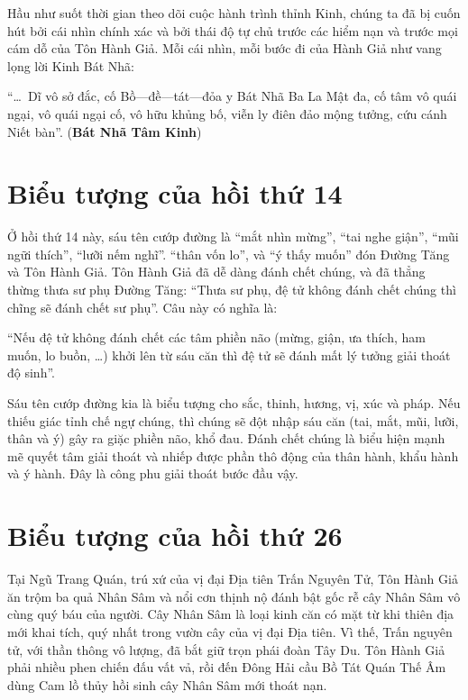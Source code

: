 Hầu như suốt thời gian theo dõi cuộc hành trình thỉnh Kinh, chúng ta đã bị cuốn hút bởi cái nhìn chính xác và bởi thái độ tự chủ trước các hiểm nạn và trước mọi cám dỗ của Tôn Hành Giả. Mỗi cái nhìn, mỗi bước đi của Hành Giả như vang lọng lời Kinh Bát Nhã:

``\ldots ~Dĩ vô sở đắc, cố Bồ—đề—tát—đỏa y Bát Nhã Ba La Mật đa, cố tâm vô quái ngại, vô quái ngại cố, vô hữu khủng bố, viễn ly điên đảo mộng tưởng, cứu cánh Niết bàn''. ({\bf Bát Nhã Tâm Kinh})

\section{Biểu tượng của hồi thứ 14} %
\label{sec:bieu_tuong_cua_hoi_thu_14}

Ở hồi thứ 14 này, sáu tên cướp đường là ``mắt nhìn mừng'', ``tai nghe giận'', ``mũi ngữi thích'', ``lưỡi nếm nghĩ''. ``thân vốn lo'', và ``ý thấy muốn'' đón Đường Tăng và Tôn Hành Giả. Tôn Hành Giả đã dễ dàng đánh chết chúng, và đã thẳng thừng thưa sư phụ Đường Tăng: ``Thưa sư phụ, đệ tử không đánh chết chúng thì chĩng sẽ đánh chết sư phụ''. Câu này có nghĩa là:

``Nếu đệ tử không đánh chết các tâm phiền não (mừng, giận, ưa thích, ham muốn, lo buồn, \ldots) khởi lên từ sáu căn thì đệ tử sẽ đánh mất lý tưởng giải thoát độ sinh''.

Sáu tên cướp đường kia là biểu tượng cho sắc, thinh, hương, vị, xúc và pháp. Nếu thiếu giác tỉnh chế ngự chúng, thì chúng sẽ đột nhập sáu căn (tai, mắt, mũi, lưỡi, thân và ý) gây ra giặc phiền não, khổ đau. Đánh chết chúng là biểu hiện mạnh mẽ quyết tâm giải thoát và nhiếp được phần thô động của thân hành, khẩu hành và ý hành. Đây là công phu giải thoát bước đầu vậy.

\section{Biểu tượng của hồi thứ 26} %
\label{sec:bieu_tuong_cua_hoi_thu_26}

Tại Ngũ Trang Quán, trú xứ của vị đại Địa tiên Trấn Nguyên Tử, Tôn Hành Giả ăn trộm ba quả Nhân Sâm và nổi cơn thịnh nộ đánh bật gốc rễ cây Nhân Sâm vô cùng quý báu của người. Cây Nhân Sâm là loại kinh căn có mặt từ khi thiên địa mới khai tích, quý nhất trong vườn cây của vị đại Địa tiên. Vì thế, Trấn nguyên tử, với thần thông vô lượng, đã bắt giữ trọn phái đoàn Tây Du. Tôn Hành Giả phải nhiều phen chiến đấu vất vả, rồi đến Đông Hải cầu Bồ Tát Quán Thế Âm dùng Cam lồ thủy hồi sinh cây Nhân Sâm mới thoát nạn.


